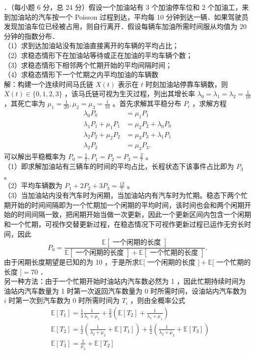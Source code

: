 \documentclass[UTF8]{ctexart}
\begin{document}
．（每小题 6 分，总 24 分）假设一个加油站有 3 个加油停车位和 2 个加油工，来到加油站的汽车按一个 Poisson 过程到达，平均每 10 分钟到达一辆．如果驾驶员发现加油车位已经被占用，则自行离开．假设每辆车加油所需时间服从均值为 20 分钟的指数分布．\\
（1）求到达加油站没有加油直接离开的车辆的平均占比；\\
（2）求稳态情形下在加油站等待或正在加油的平均车辆个数；\\
（3）求稳态情形下相邻两个忙期开始的平均间隔时间；\\
（4）求稳态情形下一个忙期之内平均加油的车辆数\\
解：构建一个连续时间马氏链 $X(t)$ 表示在 $t$ 时刻加油站停靠车辆数，则 $X(t) \in\{0,1,2,3\}$ ，该马氏链可视为生灭过程，列出其增长率 $\lambda_0=\lambda_1=\lambda_2=\frac{1}{10}$ ，其死亡率为 $\mu_1=\frac{1}{20}, \mu_2=\mu_3=\frac{1}{10}$ 。首先求解其平稳分布 $P_i$ ，求解方程\\
$$
\begin{aligned}
	\lambda_0 P_0 & =\mu_1 P_1 \\
	\lambda_1 P_1+\mu_1 P_1 & =\mu_2 P_2+\lambda_0 P_0 \\
	\lambda_2 P_2+\mu_2 P_2 & =\mu_3 P_3+\lambda_1 P_1 \\
	\lambda_2 P_2 & =\mu_3 P_3 .
\end{aligned}
$$
可以解出平稳概率为 $P_0=\frac{1}{7}, P_1=P_2=P_3=\frac{2}{7}$ 。\\
（1）即求解加油站有三辆车的时间的平均占比，长程状态下该事件占比即为 $P_3$ 。\\
（2）平均车辆数为 $P_1+2 P_2+3 P_3=\frac{12}{7}$ 。\\
（3）当加油站内没有汽车时为闲期，当加油站内有汽车时为忙期。稳态下两个忙期开始的时间间隔即为一个忙期加一个闲期的平均时间，该时间也会和两个闲期开始的时间间隔一致，把闲期开始当做一次更新，因此一个更新区间内包含一个闲期和一个忙期，可视作交替更新过程，在稳态情况下可视作更新过程已运作无穷长时间，因此\\
$$
P_0=\frac{\mathbb{E}[\text { 一个闲期的长度 }]}{\mathbb{E}[\text { 一个闲期的长度 }]+\mathbb{E}[\text { 一个忙期的长度 }]} .
$$
由于闲期长度期望是已知的为 10 ，于是所求$\mathbb{E}[$ 一个闲期的长度 $]+\mathbb{E}[$ 一个忙期的长度 $]=70$ ．\\
另一种方法：由于一个忙期开始时油站内汽车数必然为 1 ，因此忙期持续时间为油站内汽车数量为 1 时第一次返回汽车数量为 0 时所需时间，设油站内汽车数为 $i$ 时第一次到汽车数为 0 时所需时间为 $T_i$ ，则由全概率公式\\
$$
\begin{aligned}
	& \mathbb{E} [T_1]=\frac{1}{3} \frac{1}{\lambda_1+\mu_1}+\frac{2}{3}\left(\mathbb{E} [T_2]+\frac{1}{\lambda_1+\mu_1}\right) \\
	& \mathbb{E} [T_2]=\frac{1}{2}\left(\frac{1}{\lambda_2+\mu_2}+\mathbb{E} [T_1]\right)+\frac{1}{2}\left(\frac{1}{\lambda_2+\mu_2}+\mathbb{E} [T_3]\right) \\
	& \mathbb{E} [T_3]=\frac{1}{\mu_3}+\mathbb{E} [T_2]
\end{aligned}
$$
\end{document}
